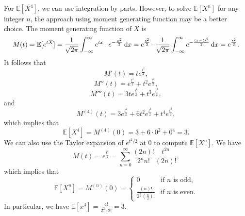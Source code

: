 \documentclass[12pt,letterpaper, onecolumn]{exam}
\begin{document}
\begin{questions}
\begin{solution}
            \quad For $\mathbb{E}[X^4]$, we can use integration by parts. However, to solve $\mathbb{E}[X^n]$ for any integer $n$, the approach using moment generating function may be a better choice. The moment generating function of $X$ is 
            $$M(t)=\mathbb{E}[e^{tX}]=\frac{1}{\sqrt{2\pi}}\int_{-\infty}^{\infty}e^{tx}\cdot e^{-\frac{x^2}{2}}\,{\rm{d}}x=e^{\frac{t^2}{2}}\cdot\frac{1}{\sqrt{2\pi}}\int_{-\infty}^{\infty}e^{-\frac{(x-t)^2}{2}}\,{\rm{d}}x=e^{\frac{t^2}{2}}.$$
            It follows that
            $$M'(t)=te^{\frac{t^2}{2}},$$
            $$M''(t)=e^{\frac{t^2}{2}}+t^2e^{\frac{t^2}{2}},$$
            $$M'''(t)=3te^{\frac{t^2}{2}}+t^3e^{\frac{t^2}{2}},$$
            and 
            $$M^{(4)}(t)=3e^{\frac{t^2}{2}}+6t^2e^{\frac{t^2}{2}}+t^4e^{\frac{t^2}{2}},$$
             which implies that 
        $$\mathbb{E}[X^4]=M^{(4)}(0)=3+6\cdot 0^2+0^4=3.$$
        \quad We can also use the Taylor expansion of $e^{t^2/2}$ at $0$ to compute $\mathbb{E}[X^n]$. We have 
        $$M(t)=e^{\frac{t^2}{2}}=\sum\limits_{n=0}^{\infty}\frac{(2n)!}{2^nn!}\frac{t^{2n}}{(2n)!},$$
        which implies that
        $$\mathbb{E}[X^n]=M^{(n)}(0)=\begin{cases}
            0&\text{if $n$ is odd},\\
            \frac{(n)!}{2^{\frac{n}{2}}(\frac{n}{2})!}&\text{if $n$ is even}.
        \end{cases}$$
        In particular, we have $\mathbb{E}[x^4]=\frac{4!}{2^2\cdot 2!}=3$.
        \end{solution}
    \end{questions}
\end{document}
